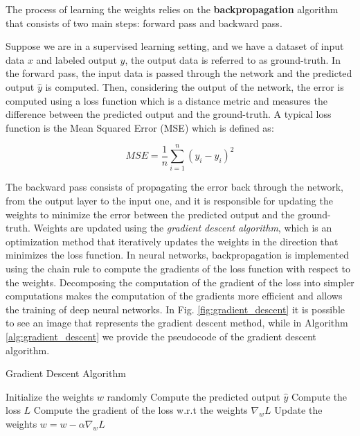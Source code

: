 The process of learning the weights relies on the \textbf{backpropagation} algorithm \citep{rumelhart1986learning} that consists of two main steps: forward pass and backward pass.

Suppose we are in a supervised learning setting, and we have a dataset of input data $x$ and labeled output $y$, the output data is referred to as ground-truth.
In the forward pass, the input data is passed through the network and the predicted output $\hat{y}$ is computed.
Then, considering the output of the network, the error is computed using a loss function which is a distance metric and measures the difference between the predicted output and the ground-truth.
A typical loss function is the Mean Squared Error (MSE) which is defined as:

\begin{equation}
    MSE = \frac{1}{n} \sum_{i=1}^{n} (y_i - \hat{y}_i)^2
\end{equation}

The backward pass consists of propagating the error back through the network, from the output layer to the input one, and it is responsible for updating the weights to minimize the error between the predicted output and the ground-truth.
Weights are updated using the \textit{gradient descent algorithm}, which is an optimization method that iteratively updates the weights in the direction that minimizes the loss function.
In neural networks, backpropagation is implemented using the chain rule to compute the gradients of the loss function with respect to the weights. 
Decomposing the computation of the gradient of the loss into simpler computations makes the computation of the gradients more efficient and allows the training of deep neural networks.
In Fig. \ref{fig:gradient_descent} it is possible to see an image that represents the gradient descent method, while in Algorithm \ref{alg:gradient_descent} we provide the pseudocode of the gradient descent algorithm.

\begin{algorithm}
\caption{Gradient Descent Algorithm}\label{alg:gradient_descent}
\begin{algorithmic}
    \State Initialize the weights $w$ randomly
        \State Compute the predicted output $\hat{y}$
        \State Compute the loss $L$
        \State Compute the gradient of the loss w.r.t the weights $\nabla_w L$
        \State Update the weights $w = w - \alpha \nabla_w L$
    \EndWhile
\end{algorithmic}
\end{algorithm}





